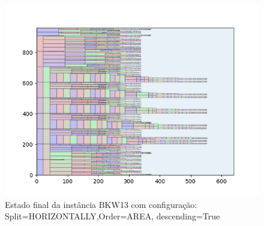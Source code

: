 \begin{figure}[H]
    \centering
    \caption[]{Estado final da instância BKW13 com configuração: Split=HORIZONTALLY,Order=AREA, descending=True}
    \label{fig:bkw13-horizontally-area-true}
    \includegraphics[scale=0.5]{output/figures/bkw/bkw13/horizontally/area/true/0000}
\end{figure}